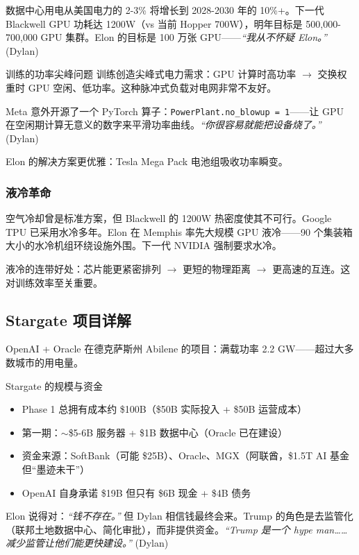 \documentclass[a4paper]{article}
\begin{document}
数据中心用电从美国电力的 2-3\% 将增长到 2028-2030 年的 10\%+。下一代 Blackwell GPU 功耗达 1200W（vs 当前 Hopper 700W），明年目标是 500,000-700,000 GPU 集群。Elon 的目标是 100 万张 GPU——\textit{``我从不怀疑 Elon。''} (Dylan)

\begin{knowledgebox}{训练的功率尖峰问题}
训练创造尖峰式电力需求：GPU 计算时高功率 $\to$ 交换权重时 GPU 空闲、低功率。这种脉冲式负载对电网非常不友好。

Meta 意外开源了一个 PyTorch 算子：\texttt{PowerPlant.no\_blowup = 1}——让 GPU 在空闲期计算无意义的数字来平滑功率曲线。\textit{``你很容易就能把设备烧了。''} (Dylan)

Elon 的解决方案更优雅：Tesla Mega Pack 电池组吸收功率瞬变。
\end{knowledgebox}

\subsubsection{液冷革命}

空气冷却曾是标准方案，但 Blackwell 的 1200W 热密度使其不可行。Google TPU 已采用水冷多年。Elon 在 Memphis 率先大规模 GPU 液冷——90 个集装箱大小的水冷机组环绕设施外围。下一代 NVIDIA 强制要求水冷。

液冷的连带好处：芯片能更紧密排列 $\to$ 更短的物理距离 $\to$ 更高速的互连。这对训练效率至关重要。

\subsection{Stargate 项目详解}

OpenAI + Oracle 在德克萨斯州 Abilene 的项目：满载功率 2.2 GW——超过大多数城市的用电量。

\begin{importantbox}{Stargate 的规模与资金}
\begin{itemize}
    \item Phase 1 总拥有成本约 \$100B（\$50B 实际投入 + \$50B 运营成本）
    \item 第一期：$\sim$\$5-6B 服务器 + \$1B 数据中心（Oracle 已在建设）
    \item 资金来源：SoftBank（可能 \$25B）、Oracle、MGX（阿联酋，\$1.5T AI 基金但``墨迹未干''）
    \item OpenAI 自身承诺 \$19B 但只有 \$6B 现金 + \$4B 债务
\end{itemize}

Elon 说得对：\textit{``钱不存在。''} 但 Dylan 相信钱最终会来。Trump 的角色是去监管化（联邦土地数据中心、简化审批），而非提供资金。\textit{``Trump 是一个 hype man……减少监管让他们能更快建设。''} (Dylan)
\end{importantbox}
\end{document}
